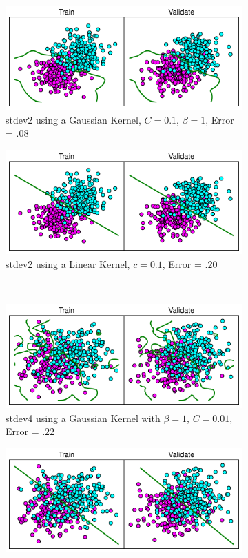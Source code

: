 \documentclass[10pt]{article}
\begin{document}
\begin{figure}[!ht]
\centering
\begin{subfigure}[t]{0.46\textwidth}
	\centering
	\includegraphics[width=.8\textwidth]{1-3-stdev2-0_1-1-gaussian-REAL.pdf}
	\caption{stdev2 using a Gaussian Kernel, $C = 0.1$, $\beta = 1$, Error = $.08$}
	\label{fig:1-3-1}
\end{subfigure}
\begin{subfigure}[t]{0.46\textwidth}
	\centering
	\includegraphics[width=.8\textwidth]{1-3-stdev2-0_1-linear-REAL.pdf}
	\caption{stdev2 using a Linear Kernel, $c = 0.1$, Error = $.20$}
	\label{fig:1-3-2}
\end{subfigure}
\\
\begin{subfigure}[t]{0.46\textwidth}
	\centering
	\includegraphics[width=.8\textwidth]{1-3-stdev4-0_01-1-gaussian-REAL.pdf}
	\caption{stdev4 using a Gaussian Kernel with $\beta = 1$, $C = 0.01$, Error = $.22$}
	\label{fig:1-3-3}
\end{subfigure}
\begin{subfigure}[t]{0.46\textwidth}
	\centering
	\includegraphics[width=.8\textwidth]{1-3-stdev4-0_01-linear-REAL.pdf}

\end{subfigure}
\end{figure}
\end{document}
